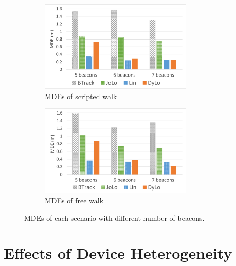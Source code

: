 \documentclass[a4paper,12pt]{report}
\begin{document}
\begin{figure}[tbph]%
    \begin{subfigure}{1\linewidth}
    \centering
        \includegraphics[width=0.8\textwidth]{images/5_7_Number_of_Beacons_MDE_SW.png}
        \caption{MDEs of scripted walk}
        \label{figure:5_7_Number_of_Beacons_MDE_SW}
    \end{subfigure}
    \begin{subfigure}{1\linewidth}
    \centering
        \includegraphics[width=0.8\textwidth]{images/5_7_Number_of_Beacons_MDE_FW.png}
        \caption{MDEs of free walk}
        \label{figure:5_7_Number_of_Beacons_MDE_FW}
    \end{subfigure}
\caption{MDEs of each scenario with different number of beacons.}
\label{figure:5_7_Number_of_Beacons_MDE}
\end{figure}

\section{Effects of Device Heterogeneity}
\end{document}
